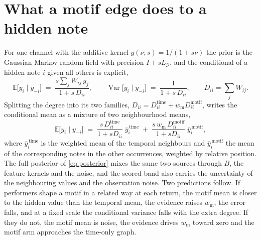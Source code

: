 \documentclass[11pt,a4paper]{report}
\newcommand{\graph}{\mathcal{G}}
\newcommand{\Lg}{L_{\graph}}
\begin{document}
\section{What a motif edge does to a hidden note}\label{sec:motif-conditional}
For one channel with the additive kernel $g(\nu; s) = 1/(1 + s\nu)$ the
prior is the Gaussian Markov random field with precision $I + s \Lg$, and
the conditional of a hidden note $i$ given all others is explicit,
\begin{equation}
  \mathbb E\bigl[y_i \mid y_{-i}\bigr] \;=\; \frac{s \sum_{j} W_{ij}\, y_j}{1 + s\, D_{ii}},
  \qquad
  \operatorname{Var}\bigl[y_i \mid y_{-i}\bigr] \;=\; \frac{1}{1 + s\, D_{ii}},
  \qquad D_{ii} = \sum_j W_{ij} .
  \label{eq:motif-cond}
\end{equation}
Splitting the degree into its two families,
$D_{ii} = D_{ii}^{\mathrm{time}} + w_{\mathrm m} D_{ii}^{\mathrm{motif}}$, writes the
conditional mean as a mixture of two neighbourhood means,
\begin{equation}
  \mathbb E\bigl[y_i \mid y_{-i}\bigr] \;=\;
  \frac{s\, D_{ii}^{\mathrm{time}}}{1 + s D_{ii}}\;\overline{y}^{\,\mathrm{time}}_i
  \;+\; \frac{s\, w_{\mathrm m}\, D_{ii}^{\mathrm{motif}}}{1 + s D_{ii}}\;\overline{y}^{\,\mathrm{motif}}_i ,
  \label{eq:motif-mix}
\end{equation}
where $\overline{y}^{\,\mathrm{time}}_i$ is the weighted mean of the temporal
neighbours and $\overline{y}^{\,\mathrm{motif}}_i$ the mean of the
corresponding notes in the other occurrences, weighted by relative position. The full posterior
of \eqref{eq:posterior} mixes the same two sources through $B$, the feature
kernels and the noise, and the scored band also carries the uncertainty
of the neighbouring values and the observation noise. Two predictions
follow. If performers shape
a motif in a related way at each return, the motif mean is closer to the
hidden value than the temporal mean, the evidence raises $w_{\mathrm m}$,
the error falls, and at a fixed scale the conditional variance falls with
the extra degree. If they do not, the motif mean is noise, the evidence
drives $w_{\mathrm m}$ toward zero and the motif arm approaches the
time-only graph.
\end{document}
